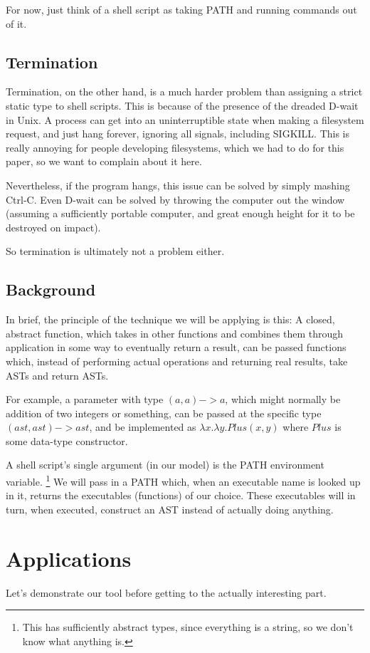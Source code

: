 \documentclass[sigplan]{acmart}
\begin{document}
For now, just think of a shell script as taking PATH and running commands out of it.
\subsection{Termination}
Termination, on the other hand, is a much harder problem than assigning a strict static type to shell scripts.
This is because of the presence of the dreaded D-wait in Unix.
A process can get into an uninterruptible state when making a filesystem request,
and just hang forever, ignoring all signals, including SIGKILL.
This is really annoying for people developing filesystems, which we had to do for this paper,
so we want to complain about it here.

Nevertheless, if the program hangs, this issue can be solved by simply mashing Ctrl-C.
Even D-wait can be solved by throwing the computer out the window
(assuming a sufficiently portable computer, and great enough height for it to be destroyed on impact).

So termination is ultimately not a problem either.
\subsection{Background}
In brief, the principle of the technique we will be applying is this:
A closed, abstract function,
which takes in other functions and combines them through application in some way to eventually return a result,
can be passed functions which, instead of performing actual operations and returning real results,
take ASTs and return ASTs.

For example, a parameter with type $(a, a) -> a$,
which might normally be addition of two integers or something,
can be passed at the specific type $(ast, ast) -> ast$,
and be implemented as $\lambda x. \lambda y. Plus (x, y)$
where $Plus$ is some data-type constructor.

A shell script's single argument (in our model) is the PATH environment variable.
\footnote{This has sufficiently abstract types, since everything is a string, so we don't know what anything is.}
We will pass in a PATH which, when an executable name is looked up in it,
returns the executables (functions) of our choice.
These executables will in turn, when executed,
construct an AST instead of actually doing anything.
\section{Applications}\label{applications}
Let's demonstrate our tool before getting to the actually interesting part.
\end{document}
